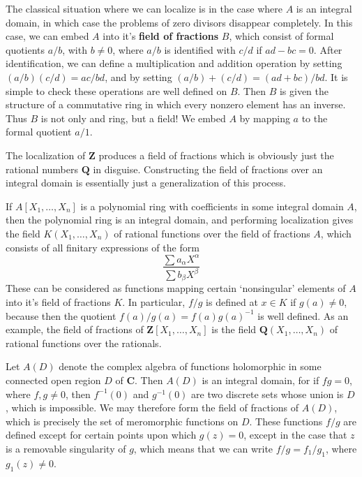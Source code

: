 The classical situation where we can localize is in the case where $A$ is an integral domain, in which case the problems of zero divisors disappear completely. In this case, we can embed $A$ into it's {\bf field of fractions} $B$, which consist of formal quotients $a/b$, with $b \neq 0$, where $a/b$ is identified with $c/d$ if $ad - bc = 0$. After identification, we can define a multiplication and addition operation by setting $(a/b)(c/d) = ac/bd$, and by setting $(a/b) + (c/d) = (ad + bc)/bd$. It is simple to check these operations are well defined on $B$. Then $B$ is given the structure of a commutative ring in which every nonzero element has an inverse. Thus $B$ is not only and ring, but a field! We embed $A$ by mapping $a$ to the formal quotient $a/1$.

\begin{example}
    The localization of $\mathbf{Z}$ produces a field of fractions which is obviously just the rational numbers $\mathbf{Q}$ in disguise. Constructing the field of fractions over an integral domain is essentially just a generalization of this process.
\end{example}

\begin{example}
    If $A[X_1, \dots, X_n]$ is a polynomial ring with coefficients in some integral domain $A$, then the polynomial ring is an integral domain, and performing localization gives the field $K(X_1, \dots, X_n)$ of rational functions over the field of fractions $A$, which consists of all finitary expressions of the form
    \[ \frac{\sum a_\alpha X^\alpha}{\sum b_\beta X^\beta} \]
    These can be considered as functions mapping certain `nonsingular' elements of $A$ into it's field of fractions $K$. In particular, $f/g$ is defined at $x \in K$ if $g(a) \neq 0$, because then the quotient $f(a)/g(a) = f(a) g(a)^{-1}$ is well defined. As an example, the field of fractions of $\mathbf{Z}[X_1, \dots, X_n]$ is the field $\mathbf{Q}(X_1, \dots, X_n)$ of rational functions over the rationals.
\end{example}

\begin{example}
    Let $A(D)$ denote the complex algebra of functions holomorphic in some connected open region $D$ of $\mathbf{C}$. Then $A(D)$ is an integral domain, for if $fg = 0$, where $f,g \neq 0$, then $f^{-1}(0)$ and $g^{-1}(0)$ are two discrete sets whose union is $D$, which is impossible. We may therefore form the field of fractions of $A(D)$, which is precisely the set of meromorphic functions on $D$. These functions $f/g$ are defined except for certain points upon which $g(z) = 0$, except in the case that $z$ is a removable singularity of $g$, which means that we can write $f/g = f_1/g_1$, where $g_1(z) \neq 0$.
\end{example}

